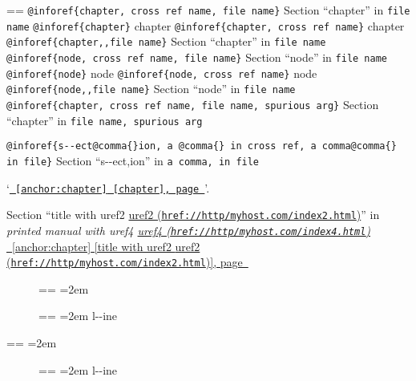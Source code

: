 \documentclass{book}
\makeatletter
\newenvironment{GNUTexinfopreformatted}{%
  \par\obeylines\obeyspaces\frenchspacing
  \parskip=\z@\parindent=\z@}{}
\makeatother
\begin{document}
\begin{GNUTexinfopreformatted}
\texttt{@inforef\{chapter,\ cross ref name,\ file name\}} Section ``chapter'' in \texttt{file name}
\texttt{@inforef\{chapter\}} chapter
\texttt{@inforef\{chapter,\ cross ref name\}} chapter
\texttt{@inforef\{chapter{,}{,}file name\}} Section ``chapter'' in \texttt{file name}
\texttt{@inforef\{node,\ cross ref name,\ file name\}} Section ``node'' in \texttt{file name}
\texttt{@inforef\{node\}} node
\texttt{@inforef\{node,\ cross ref name\}} node
\texttt{@inforef\{node{,}{,}file name\}} Section ``node'' in \texttt{file name}
\texttt{@inforef\{chapter,\ cross ref name,\ file name,\ spurious arg\}} Section ``chapter'' in \texttt{file name,\ spurious arg}

\texttt{@inforef\{s{-}{-}ect@comma\{\}ion,\ a @comma\{\} in cross
ref,\ a comma@comma\{\} in file\}}
Section ``s{-}{-}ect,ion'' in \texttt{a comma, in file}

`\texttt{\hyperref[anchor:chapter]{\chaptername~\ref*{anchor:chapter} [chapter], page~\pageref*{anchor:chapter}}}'.

Section ``title with uref2 \href{href://http/myhost.com/index2.html}{uref2 (\nolinkurl{href://http/myhost.com/index2.html})}'' in \textsl{printed manual with uref4 \href{href://http/myhost.com/index4.html}{uref4 (\nolinkurl{href://http/myhost.com/index4.html})}}
\hyperref[anchor:chapter]{\chaptername~\ref*{anchor:chapter} [title with uref2 \href{href://http/myhost.com/index2.html}{uref2 (\nolinkurl{href://http/myhost.com/index2.html})}], page~\pageref*{anchor:chapter}}

\end{GNUTexinfopreformatted}
\begin{description}
\item[] \begin{GNUTexinfopreformatted}
\leftskip=2em\relax\ttfamily%
\end{GNUTexinfopreformatted}
\item[{\parbox[b]{\linewidth}{%
\textbf{a--strong}}}]
\begin{GNUTexinfopreformatted}
\leftskip=2em\relax\ttfamily%
l{-}{-}ine
\end{GNUTexinfopreformatted}
\end{description}
\begin{GNUTexinfopreformatted}
\leftskip=2em\relax\ttfamily%

\end{GNUTexinfopreformatted}
\begin{description}
\item[{\parbox[b]{\linewidth}{%
a--asis\\
\index[cp]{a--asis@\texttt{a{-}{-}asis}}%
b
\index[cp]{b@\texttt{b}}%
}}]
\begin{GNUTexinfopreformatted}
\leftskip=2em\relax\ttfamily%
l{-}{-}ine
\end{GNUTexinfopreformatted}
\end{description}
\end{document}

